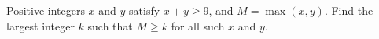 Positive integers $x$ and $y$ satisfy $x+y\ge9$, and $M=\max(x,y)$. Find the largest integer $k$ such that $M\ge k$ for all such $x$ and $y$.
